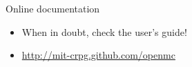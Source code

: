 \documentclass[serif]{beamer}
\begin{document}

\begin{frame}{Online documentation}
  \begin{itemize}
  \item<1-> When in doubt, check the user's guide!
  \item<1-> \url{http://mit-crpg.github.com/openmc}
  \end{itemize}
\end{frame}

\end{document}
